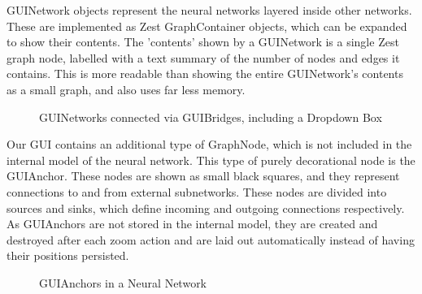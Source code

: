 \documentclass{acm_proc_article-sp}
\begin{document}
{GUINetwork objects represent the neural networks layered inside other networks. These are implemented as Zest GraphContainer objects, which can be expanded to show their contents. The 'contents' shown by a GUINetwork is a single Zest graph node, labelled with a text summary of the number of nodes and edges it contains. This is more readable than showing the entire GUINetwork's contents as a small graph, and also uses far less memory.

\begin{figure}[t]
\centering
{}
\caption{GUINetworks connected via GUIBridges, including a Dropdown Box}
\label{fig:ui:networkconn}
\end{figure}

Our GUI contains an additional type of GraphNode, which is not included in the internal model of the neural network. This type of purely decorational node is the GUIAnchor. These nodes are shown as small black squares, and they represent connections to and from external subnetworks. These nodes are divided into sources and sinks, which define incoming and outgoing connections respectively. As GUIAnchors are not stored in the internal model, they are created and destroyed after each zoom action and are laid out automatically instead of having their positions persisted.
\begin{figure}[t]
\centering
{}
\caption{GUIAnchors in a Neural Network}
\label{fig:ui:guianchor}
\end{figure}
}
\end{document}
